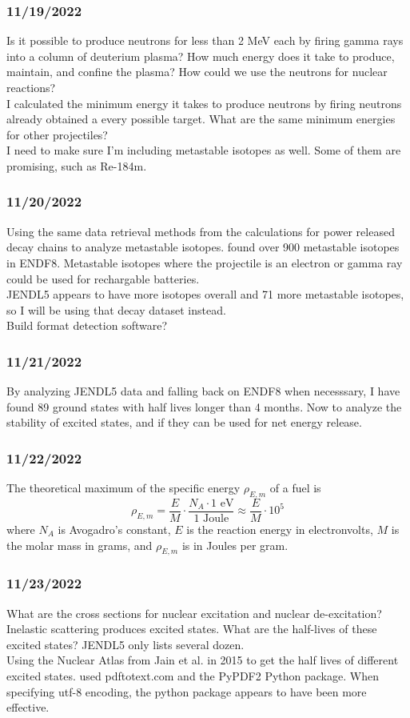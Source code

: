 \documentclass[12pt]{article}
\begin{document}
\subsubsection{11/19/2022}
Is it possible to produce neutrons for less than 2 MeV each by firing gamma rays into a column of deuterium plasma? How much energy does it take to produce, maintain, and confine the plasma? How could we use the neutrons for nuclear reactions? \\
I calculated the minimum energy it takes to produce neutrons by firing neutrons already obtained a every possible target. What are the same minimum energies for other projectiles? \\
I need to make sure I'm including metastable isotopes as well. Some of them are promising, such as Re-184m. 
\subsubsection{11/20/2022}
Using the same data retrieval methods from the calculations for power released decay chains to analyze metastable isotopes. found over 900 metastable isotopes in ENDF8. Metastable isotopes where the projectile is an electron or gamma ray could be used for rechargable batteries.\\
JENDL5 appears to have more isotopes overall and 71 more metastable isotopes, so I will be using that decay dataset instead. \\
Build format detection software?
\subsubsection{11/21/2022}
By analyzing JENDL5 data and falling back on ENDF8 when necesssary, I have found 89 ground states with half lives longer than 4 months. Now to analyze the stability of excited states, and if they can be used for net energy release. 
\subsubsection{11/22/2022}
The theoretical maximum of the specific energy $\rho_{E,m}$ of a fuel is 
\begin{equation}
    \rho_{E,m} = \frac{E}{M} \cdot \frac{N_A\cdot 1 \text{ eV}}{1 \text{ Joule}} \approx 
    \frac{E}{M} \cdot 10^5 
\end{equation}
where $N_A$ is Avogadro's constant, $E$ is the reaction energy in electronvolts, $M$ is the molar mass in grams, and $\rho_{E,m}$ is in Joules per gram. 
\subsubsection{11/23/2022}
What are the cross sections for nuclear excitation and nuclear de-excitation? Inelastic scattering produces excited states. What are the half-lives of these excited states? JENDL5 only lists several dozen. \\
Using the Nuclear Atlas from Jain et al. in 2015 to get the half lives of different excited states. used pdftotext.com and the PyPDF2 Python package. When specifying utf-8 encoding, the python package appears to have been more effective.
\end{document}
